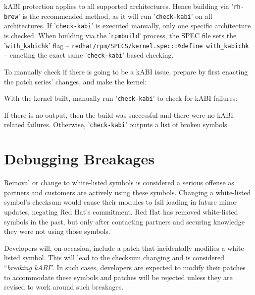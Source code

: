 \documentclass[10pt,oneside,english]{book}
\begin{document}
kABI protection applies to all supported architectures. Hence building
via '\texttt{rh-brew}' is the recommended method, as it will run '\texttt{check-kabi}'
on all architectures. If '\texttt{check-kabi}' is executed manually,
only one specific architecture is checked. When building via the '\texttt{rpmbuild}'
process, the SPEC file sets the '\texttt{with\_kabichk}' flag --
\texttt{redhat/rpm/SPECS/kernel.spec::\%define with\_kabichk} --
enacting the exact same '\texttt{check-kabi}' based checking.

To manually check if there is going to be a kABI issue, prepare by
first enacting the patch series' changes, and make the kernel:


With the kernel built, manually run '\texttt{check-kabi}' to check
for kABI failures:


If there is no output, then the build was successful and there were
no kABI related failures. Otherwise, '\texttt{check-kabi}' outputs
a list of broken symbols.

\section{Debugging Breakages}

Removal or change to white-listed symbols is considered a serious
offense as partners and customers are actively using these symbols.
Changing a white-listed symbol's checksum would cause their modules
to fail loading in future minor updates, negating Red Hat's commitment.
Red Hat has removed white-listed symbols in the past, but only after
contacting partners and securing knowledge they were not using those
symbols.

Developers will, on occasion, include a patch that incidentally modifies
a white-listed symbol. This will lead to the checksum changing and
is considered ``\emph{breaking kABI}''. In such cases, developers
are expected to modify their patches to accommodate these symbols
and patches will be rejected unless they are revised to work around
such breakages.
\end{document}
